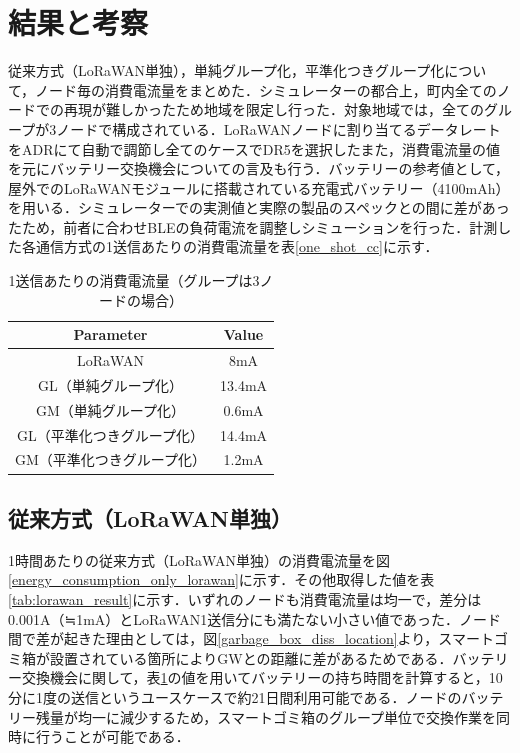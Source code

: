 \documentclass[Japanese]{dicomopapers}
\begin{document}
\section{結果と考察}
従来方式（LoRaWAN単独），単純グループ化，平準化つきグループ化について，ノード毎の消費電流量をまとめた．シミュレーターの都合上，町内全てのノードでの再現が難しかったため地域を限定し行った．対象地域では，全てのグループが3ノードで構成されている．LoRaWANノードに割り当てるデータレートをADRにて自動で調節し全てのケースでDR5を選択したまた，消費電流量の値を元にバッテリー交換機会についての言及も行う．バッテリーの参考値として，屋外でのLoRaWANモジュール\cite{outdoor_lorawan_module}に搭載されている充電式バッテリー（4100mAh）を用いる．シミュレーターでの実測値と実際の製品のスペックとの間に差があったため，前者に合わせBLEの負荷電流を調整しシミューションを行った．計測した各通信方式の1送信あたりの消費電流量を表\ref{one_shot_cc}に示す．

\begin{table}[h]
    \centering
    \caption{1送信あたりの消費電流量（グループは3ノードの場合）}
    \label{tab:one_shot_cc}
    \begin{tabular}{|c|c|}
    \hline
    \textbf{Parameter} & \textbf{Value}   \\ \hline
    LoRaWAN                   & 8mA       \\ \hline
    GL（単純グループ化）         & 13.4mA    \\ \hline
    GM（単純グループ化）         & 0.6mA     \\ \hline
    GL（平準化つきグループ化）    & 14.4mA    \\ \hline
    GM（平準化つきグループ化）    & 1.2mA     \\ \hline
    \end{tabular}
\end{table}

\subsection{従来方式（LoRaWAN単独）}
1時間あたりの従来方式（LoRaWAN単独）の消費電流量を図\ref{energy_consumption_only_lorawan}に示す．その他取得した値を表\ref{tab:lorawan_result}に示す．いずれのノードも消費電流量は均一で，差分は0.001A（≒1mA）とLoRaWAN1送信分にも満たない小さい値であった．ノード間で差が起きた理由としては，図\ref{garbage_box_diss_location}より，スマートゴミ箱が設置されている箇所によりGWとの距離に差があるためである．バッテリー交換機会に関して，表\ref{tab:one_shot_cc}の値を用いてバッテリーの持ち時間を計算すると，10分に1度の送信というユースケースで約21日間利用可能である．ノードのバッテリー残量が均一に減少するため，スマートゴミ箱のグループ単位で交換作業を同時に行うことが可能である．
\end{document}
